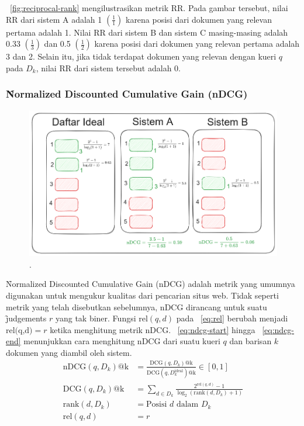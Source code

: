         \pic~\ref{fig:reciprocal-rank} mengilustrasikan metrik RR. Pada gambar tersebut, nilai RR dari sistem A adalah 1 $(\frac{1}{1})$ karena posisi dari dokumen yang relevan pertama adalah 1. Nilai RR dari sistem B dan sistem C masing-masing adalah  0.33 $(\frac{1}{3})$ dan 0.5 $(\frac{1}{2})$ karena posisi dari dokumen yang relevan pertama adalah 3 dan 2. Selain itu, jika tidak terdapat dokumen yang relevan dengan kueri $q$ pada $D_k$, nilai RR dari sistem tersebut adalah 0. 

    \subsubsection{\f{Normalized Discounted Cumulative Gain} (nDCG)}

        \begin{figure}
            \centering
            \includegraphics[width=1\textwidth]{assets/pics/contohnDCG.png}
            \caption{\license.}
            \label{fig:ndcg}
        \end{figure}
        \f{Normalized Discounted Cumulative Gain} (nDCG) adalah metrik yang umumnya digunakan untuk mengukur kualitas dari pencarian situs web. Tidak seperti metrik yang telah disebutkan sebelumnya, nDCG dirancang untuk suatu \f{judgements} $r$ yang tak biner. Fungsi $\text{rel}(q, d)$ pada \equ~\ref{eq:rel} berubah menjadi $\text{rel(q,d)}  = r $ ketika menghitung metrik nDCG. \equ~\ref{eq:ndcg-start} hingga \equ~\ref{eq:ndcg-end} menunjukkan cara menghitung nDCG dari suatu kueri $q$ dan barisan $k$ dokumen yang diambil oleh sistem.
        \begin{align}
            \label{eq:ndcg-start}
            \text{nDCG}(q, D_k)\text{@k} &= \frac{\text{DCG}(q, D_k)\text{@k}}{\text{DCG}(q, D_k^{\text{ideal}})\text{@k}} \in [0, 1] \\
            \label{eq:dcg}
            \text{DCG}(q, D_k)\text{@k} &= \sum_{d \in D_k} \frac{2^{\text{rel}(q, d)} - 1}{\log_2(\text{rank}(d, D_k) + 1)} \\
            \label{eq:ndcg-end}
            \text{rank}(d,D_k) &= \text{Posisi } d \text{ dalam } D_k \\
            \text{rel}(q, d) &= r
        \end{align}

